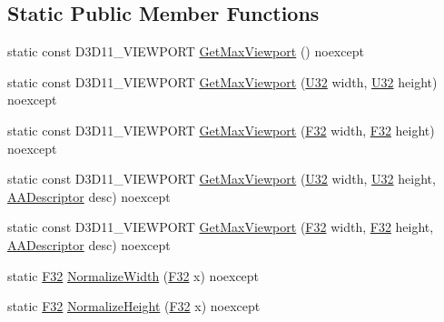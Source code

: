\subsection*{Static Public Member Functions}
\begin{DoxyCompactItemize}
\item 
static const D3\+D11\+\_\+\+V\+I\+E\+W\+P\+O\+RT \hyperlink{classmage_1_1_viewport_aec4a434cbb6f68805d02f1be6ecbf5a8}{Get\+Max\+Viewport} () noexcept
\item 
static const D3\+D11\+\_\+\+V\+I\+E\+W\+P\+O\+RT \hyperlink{classmage_1_1_viewport_a6463b68fb105634e92fef03923860275}{Get\+Max\+Viewport} (\hyperlink{namespacemage_a41c104c036fba3756a74e19f793eeaa1}{U32} width, \hyperlink{namespacemage_a41c104c036fba3756a74e19f793eeaa1}{U32} height) noexcept
\item 
static const D3\+D11\+\_\+\+V\+I\+E\+W\+P\+O\+RT \hyperlink{classmage_1_1_viewport_afa370989bface41f89d1dc11b11ac0bd}{Get\+Max\+Viewport} (\hyperlink{namespacemage_aa97e833b45f06d60a0a9c4fc22ae02c0}{F32} width, \hyperlink{namespacemage_aa97e833b45f06d60a0a9c4fc22ae02c0}{F32} height) noexcept
\item 
static const D3\+D11\+\_\+\+V\+I\+E\+W\+P\+O\+RT \hyperlink{classmage_1_1_viewport_a04cd0dec1cbb66cfe0a8776870a175d7}{Get\+Max\+Viewport} (\hyperlink{namespacemage_a41c104c036fba3756a74e19f793eeaa1}{U32} width, \hyperlink{namespacemage_a41c104c036fba3756a74e19f793eeaa1}{U32} height, \hyperlink{namespacemage_a86cd40b8f2f42ca4d616cc6ec665a7f2}{A\+A\+Descriptor} desc) noexcept
\item 
static const D3\+D11\+\_\+\+V\+I\+E\+W\+P\+O\+RT \hyperlink{classmage_1_1_viewport_aa217e71e22be17179f6e1e9e18b30b77}{Get\+Max\+Viewport} (\hyperlink{namespacemage_aa97e833b45f06d60a0a9c4fc22ae02c0}{F32} width, \hyperlink{namespacemage_aa97e833b45f06d60a0a9c4fc22ae02c0}{F32} height, \hyperlink{namespacemage_a86cd40b8f2f42ca4d616cc6ec665a7f2}{A\+A\+Descriptor} desc) noexcept
\item 
static \hyperlink{namespacemage_aa97e833b45f06d60a0a9c4fc22ae02c0}{F32} \hyperlink{classmage_1_1_viewport_a2c00b7da56962f96830fd7626ef85d04}{Normalize\+Width} (\hyperlink{namespacemage_aa97e833b45f06d60a0a9c4fc22ae02c0}{F32} x) noexcept
\item 
static \hyperlink{namespacemage_aa97e833b45f06d60a0a9c4fc22ae02c0}{F32} \hyperlink{classmage_1_1_viewport_a7e8becd79a69371d7f6d513c88b04a5a}{Normalize\+Height} (\hyperlink{namespacemage_aa97e833b45f06d60a0a9c4fc22ae02c0}{F32} x) noexcept
\end{DoxyCompactItemize}
